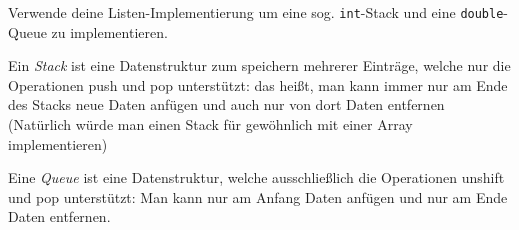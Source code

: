 \begin{aufg}
Verwende deine Listen-Implementierung um eine sog. \verb|int|-Stack und eine \verb|double|-Queue zu implementieren.

Ein \emph{Stack} ist eine Datenstruktur zum speichern mehrerer Einträge, welche nur die Operationen push und pop unterstützt: das heißt, man kann immer nur am Ende des Stacks neue Daten anfügen und auch nur von dort Daten entfernen (Natürlich würde man einen Stack für gewöhnlich mit einer Array implementieren)

Eine \emph{Queue} ist eine Datenstruktur, welche ausschließlich die Operationen unshift und pop unterstützt: Man kann nur am Anfang Daten anfügen und nur am Ende Daten entfernen.

\end{aufg}